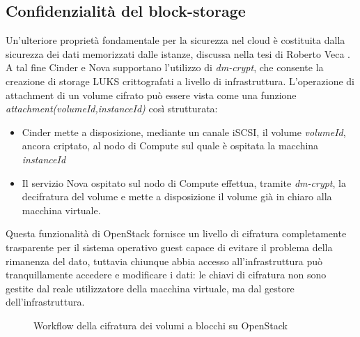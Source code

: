 \documentclass[../main.tex]{subfiles}
\begin{document}
\subsection{Confidenzialità del block-storage}
Un'ulteriore proprietà fondamentale per la sicurezza nel cloud è costituita dalla sicurezza dei dati memorizzati dalle istanze, discussa nella tesi di Roberto Veca \cite{RobertoVeca}.
A tal fine Cinder e Nova supportano l'utilizzo di \textit{dm-crypt}, che consente la creazione di storage LUKS crittografati a livello di infrastruttura.
L'operazione di attachment di un volume cifrato può essere vista come una funzione \textit{attachment(volumeId,instanceId)} così strutturata:
\begin{itemize}
\item Cinder mette a disposizione, mediante un canale iSCSI, il volume \textit{volumeId}, ancora criptato, al nodo di Compute sul quale è ospitata la macchina \textit{instanceId}
\item Il servizio Nova ospitato sul nodo di Compute effettua, tramite \textit{dm-crypt}, la decifratura del volume e mette a disposizione il volume già in chiaro alla macchina virtuale.
\end{itemize}
Questa funzionalità di OpenStack fornisce un livello di cifratura completamente trasparente per il sistema operativo guest capace di evitare il problema della rimanenza del dato, tuttavia chiunque abbia accesso all'infrastruttura può tranquillamente accedere e modificare i dati: le chiavi di cifratura non sono gestite dal reale utilizzatore della macchina virtuale, ma dal gestore dell'infrastruttura.
\begin{figure}[H]
\centering
{}
\caption{Workflow della cifratura dei volumi a blocchi su OpenStack \cite{OpenStackBlockEnc}}\label{VolumeEnc}
\end{figure}
\end{document}
